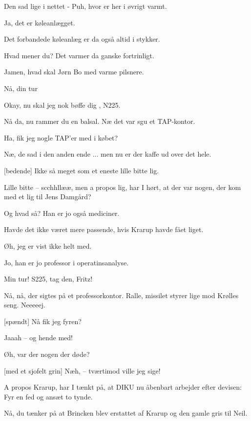 \documentclass[a4paper,11pt]{article}
\begin{document}
\begin{sketch}

 Den sad lige i nettet - Puh, hvor er her i øvrigt varmt.

 Ja, det er køleanlægget.

 Det forbandede køleanlæg er da også altid i stykker.

 Hvad mener du? Det varmer da ganske fortrinligt.

 Jamen, hvad skal Jørn Bo med varme pilsnere.

 Nå, din tur 

 Okay, nu skal jeg nok bøffe dig , N225.

 Nå da, nu rammer du en balsal. Næ det var sgu et TAP-kontor.


 Ha, fik jeg nogle TAP'er med i købet?

 Næ, de sad i den anden ende ... men nu er der kaffe ud over det hele.

[bedende] Ikke så meget som et eneste lille bitte lig.

 Lille bitte -- scchhllææ, men a propos lig, har I hørt, at der var
nogen, der kom med et lig til Jens Damgård?

 Og hvad så? Han er jo også mediciner.

 Havde det ikke været mere passende, hvis Krarup havde fået liget.

 Øh, jeg er vist ikke helt med.

 Jo, han er jo professor i operatinsanalyse.

 Min tur! S225, tag den, Fritz!

 Nå, nå, der sigtes på et professorkontor. Ralle, missilet styrer lige
mod Krølles seng. Neeeeej.



[spændt] Nå fik jeg fyren?

 Jaaah -- og hende med!

 Øh, var der nogen der døde?

[med et sjofelt grin] Næh, -- tværtimod ville jeg sige!

 A propos Krarup, har I tænkt på, at DIKU nu åbenbart arbejder efter
devisen: Fyr en fed og ansæt to tynde.

 Nå, du tænker på at Brincken blev erstattet af Krarup og den gamle gris
til Neil.


\end{sketch}
\end{document}
